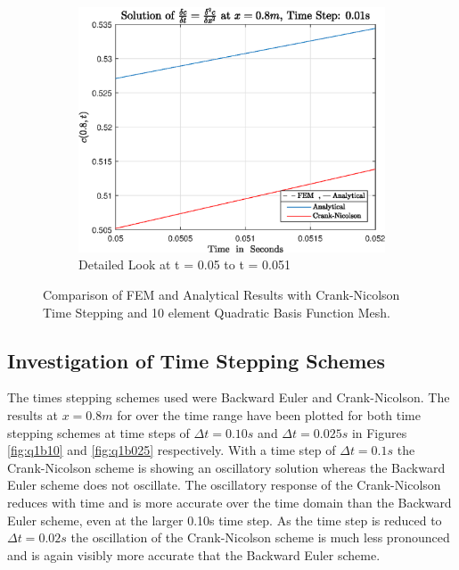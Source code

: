 \documentclass[11pt]{article}
\begin{document}
\begin{figure}[h!]
\begin{subfigure}[b]{0.475\textwidth}
            \includegraphics[width=\textwidth]{epsQ1bZoom}
            \caption[]%
            {{\small Detailed Look at t = 0.05 to t = 0.051}}    
            \label{fig:q1bzoom}
        \end{subfigure}
        \caption[ Comparison of FEM and Analytical Results Over Spatial Domain at $x = 0.8m$]
        {\small Comparison of FEM and Analytical Results with Crank-Nicolson Time Stepping and 10 element Quadratic Basis Function Mesh.} 
        \label{fig:q1a}
\end{figure}

\FloatBarrier
\subsection{Investigation of Time Stepping Schemes}

The times stepping schemes used were Backward Euler and Crank-Nicolson. The results at $x = 0.8m$ for over the time range have been plotted for both time stepping schemes at time steps of $\Delta t = 0.10s$ and $\Delta t = 0.025s$ in Figures \ref{fig:q1b10} and \ref{fig:q1b025} respectively. With a time step of $\Delta t = 0.1s$  the Crank-Nicolson scheme is showing an oscillatory solution whereas the Backward Euler scheme does not oscillate. The oscillatory response of the Crank-Nicolson reduces with time and is more accurate over the time domain than the Backward Euler scheme, even at the larger 0.10s time step. As the time step is reduced to $\Delta t = 0.02s$ the oscillation of the Crank-Nicolson scheme is much less pronounced and is again visibly more accurate that the Backward Euler scheme. 
\end{document}

